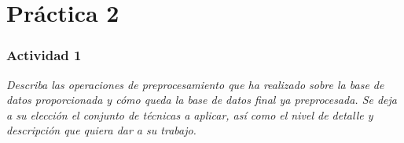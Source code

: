 \part{Práctica 2}
\section{Actividad 1}
\label{p21}
\begin{center}
    \parbox{12cm}{\justify\textit{Describa las operaciones de preprocesamiento que ha realizado sobre la base de datos proporcionada y cómo queda la base de datos final ya preprocesada. Se deja a su elección el conjunto de técnicas a aplicar, así como el nivel de detalle y descripción que quiera dar a su trabajo.}}
\end{center}